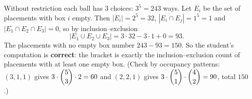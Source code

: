 Without restriction each ball has $3$ choices: $3^5=243$ ways. Let $E_i$ be the set of placements with box $i$ empty. Then $|E_i|=2^5=32$, $|E_i\cap E_j|=1^5=1$ and $|E_1\cap E_2\cap E_3|=0$, so by inclusion--exclusion
\[|E_1\cup E_2\cup E_3|=3\cdot32-3\cdot1+0=93.\]
The placements with no empty box number $243-93=\boxed{150}$. So the student's computation is \textbf{correct}: the bracket is exactly the inclusion--exclusion count of placements with at least one empty box. (Check by occupancy patterns: $(3,1,1)$ gives $3\cdot\dbinom53\cdot2=60$ and $(2,2,1)$ gives $3\cdot\dbinom51\cdot\dbinom42=90$, total $150$.)
